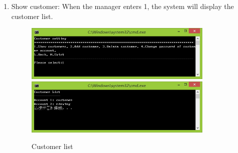 \documentclass{article}
\begin{document}
\begin{enumerate}
    \item Show customer:\newline 
    When the manager enters 1, the system will display the customer list.
        \begin{figure}[H]
        \centering
        \includegraphics[width=0.85\textwidth]{A/A1a.jpg}
        \includegraphics[width=0.85\textwidth]{A/A1b.jpg}
        \caption{Customer list}
        \end{figure}
    

\end{enumerate}
\end{document}
